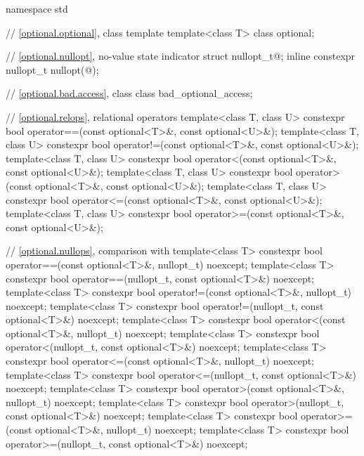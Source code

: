 %
\begin{codeblock}
namespace std {
  // \ref{optional.optional}, class template 
  template<class T>
    class optional;

  // \ref{optional.nullopt}, no-value state indicator
  struct nullopt_t{@\seebelow@};
  inline constexpr nullopt_t nullopt(@\unspec@);

  // \ref{optional.bad.access}, class 
  class bad_optional_access;

  // \ref{optional.relops}, relational operators
  template<class T, class U>
  constexpr bool operator==(const optional<T>&, const optional<U>&);
  template<class T, class U>
  constexpr bool operator!=(const optional<T>&, const optional<U>&);
  template<class T, class U>
  constexpr bool operator<(const optional<T>&, const optional<U>&);
  template<class T, class U>
  constexpr bool operator>(const optional<T>&, const optional<U>&);
  template<class T, class U>
  constexpr bool operator<=(const optional<T>&, const optional<U>&);
  template<class T, class U>
  constexpr bool operator>=(const optional<T>&, const optional<U>&);

  // \ref{optional.nullops}, comparison with 
  template<class T> constexpr bool operator==(const optional<T>&, nullopt_t) noexcept;
  template<class T> constexpr bool operator==(nullopt_t, const optional<T>&) noexcept;
  template<class T> constexpr bool operator!=(const optional<T>&, nullopt_t) noexcept;
  template<class T> constexpr bool operator!=(nullopt_t, const optional<T>&) noexcept;
  template<class T> constexpr bool operator<(const optional<T>&, nullopt_t) noexcept;
  template<class T> constexpr bool operator<(nullopt_t, const optional<T>&) noexcept;
  template<class T> constexpr bool operator<=(const optional<T>&, nullopt_t) noexcept;
  template<class T> constexpr bool operator<=(nullopt_t, const optional<T>&) noexcept;
  template<class T> constexpr bool operator>(const optional<T>&, nullopt_t) noexcept;
  template<class T> constexpr bool operator>(nullopt_t, const optional<T>&) noexcept;
  template<class T> constexpr bool operator>=(const optional<T>&, nullopt_t) noexcept;
  template<class T> constexpr bool operator>=(nullopt_t, const optional<T>&) noexcept;

}
\end{codeblock}
